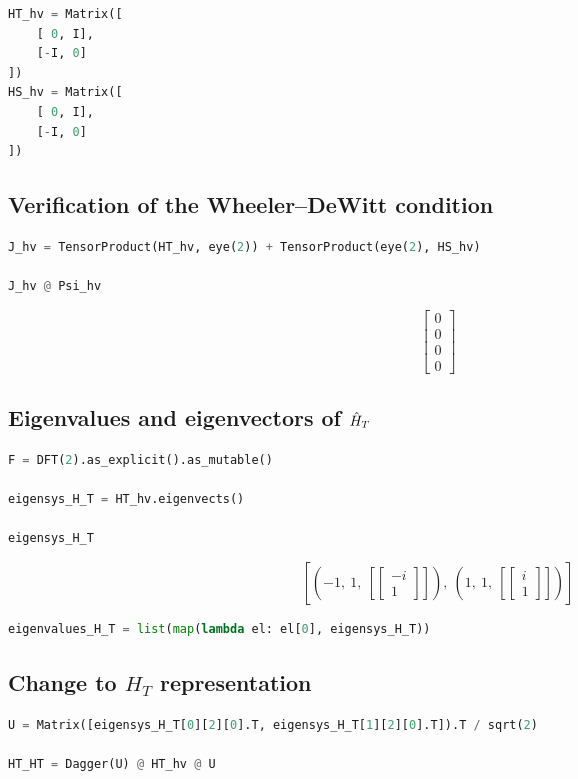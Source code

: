 \begin{lstlisting}[language=Python]
HT_hv = Matrix([
    [ 0, I],
    [-I, 0]
])
HS_hv = Matrix([
    [ 0, I],
    [-I, 0]
])
\end{lstlisting}

\subsection*{Verification of the Wheeler--DeWitt condition}

\begin{lstlisting}[language=Python]
J_hv = TensorProduct(HT_hv, eye(2)) + TensorProduct(eye(2), HS_hv)

J_hv @ Psi_hv
\end{lstlisting}

$$
  \left[\begin{matrix}0\\0\\0\\0\end{matrix}\right]
$$

\subsection*{Eigenvalues and eigenvectors of $\hat{H}_T$}

\begin{lstlisting}[language=Python]
F = DFT(2).as_explicit().as_mutable()

eigensys_H_T = HT_hv.eigenvects()

eigensys_H_T
\end{lstlisting}
$$
  \left[ \left( -1, \  1, \  \left[ \left[\begin{matrix}- i\\1\end{matrix}\right]\right]\right), \  \left( 1, \  1, \  \left[ \left[\begin{matrix}i\\1\end{matrix}\right]\right]\right)\right]
$$
\begin{lstlisting}[language=Python]
eigenvalues_H_T = list(map(lambda el: el[0], eigensys_H_T))
\end{lstlisting}

\subsection*{Change to $H_T$ representation}

\begin{lstlisting}[language=Python]
U = Matrix([eigensys_H_T[0][2][0].T, eigensys_H_T[1][2][0].T]).T / sqrt(2)

HT_HT = Dagger(U) @ HT_hv @ U
\end{lstlisting}

